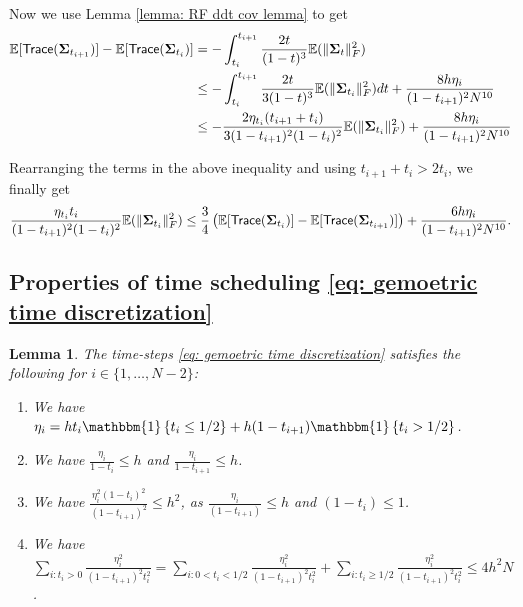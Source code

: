\documentclass{article}
\theoremstyle{plain}
\newtheorem{lemma}[theorem]{Lemma}
\theoremstyle{definition}
\theoremstyle{remark}
\def\bbE{\mathbb{E}}
\def\bSigma{{\boldsymbol\Sigma}}
\def\Norm#1{\Vert#1\Vert}
\def\tr{{\sf tr}}
\def\tr{{\sf Trace}}
\def\ind{{\mathbbm{1}}}
\newcommand{\bc}[1]{\left\{{#1}\right\}}
\begin{document}
Now we use Lemma \ref{lemma: RF ddt cov lemma} to get 
\begin{equation*}
    \begin{aligned}
        \bbE [\tr(\bSigma_{t_{i+1}})] - \bbE[\tr(\bSigma_{t_{i}})] & =  -\int_{t_{i}}^{t_{i+1}} \frac{2t}{(1-t)^3} \bbE(\Norm{\bSigma_t}_F^2)\\
        & \le - \int_{t_i}^{t_{i+1}} \frac{2t }{3(1-t)^3 }\bbE(\Norm{\bSigma_{t_i}}_F^2)dt + \frac{8 h \eta_{i}}{(1-t_{i+1})^2 N^{10}}\\
        & \le - \frac{2 \eta_{t_i}(t_{i+1}+ t_i)}{3(1-t_{i+1})^2 (1-t_i)^2}  \bbE(\Norm{\bSigma_{t_i}}_F^2) + \frac{8 h \eta_{i} }{(1-t_{i+1})^2 N^{10}}
    \end{aligned}
\end{equation*}

Rearranging the terms in the above inequality and using $t_{i+1} + t_i> 2t_i$, we finally get 
\begin{equation}
    \label{eq: Main cov bound via trace}
    \frac{ \eta_{t_i}t_i}{(1-t_{i+1})^2 (1-t_i)^2}  \bbE(\Norm{\bSigma_{t_i}}_F^2)  \le \frac{3}{4} \left(\bbE [\tr(\bSigma_{t_{i}})] - \bbE[\tr(\bSigma_{t_{i+1}})]\right) + \frac{6 h \eta_{i} }{(1-t_{i+1})^2 N^{10}}.
\end{equation}

\subsection{Properties of  time scheduling \eqref{eq: gemoetric time discretization}}


\begin{lemma}
    \label{lemma: properties of time-steps}
    The time-steps \eqref{eq: gemoetric time discretization} satisfies the following for $i \in \{1, \ldots, N-2\}$:
    \begin{enumerate}[label = (\alph*)]
    \item\label{item: part a} We have $\eta_i = h t_i \ind\bc{t_{i} \le 1/2} + h (1-t_{i+1}) \ind\bc{t_i > 1/2}$.
    
    \item\label{item: part b} We have $\frac{\eta_i}{1-t_i} \le h$ and $\frac{\eta_i}{1-t_{i+1}} \le h$.
    
     \item\label{item: part c} We have $\frac{ \eta_i^2 (1-t_i)^2 }{(1-t_{i+1})^2} \le h^2 $, as $\frac{\eta_i}{(1-t_{i+1})} \le h$ and $(1-t_i) \le 1$.
     
     \item\label{item: part d} We have $\sum_{i : t_i >0}\frac{ \eta_i^2 }{(1-t_{i+1})^2 t_i^2} = \sum_{i: 0 < t_{i} < 1/2 }\frac{ \eta_i^2 }{(1-t_{i+1})^2 t_i^2} + \sum_{i: t_{i}\ge 1/2 }\frac{ \eta_i^2 }{(1-t_{i+1})^2 t_i^2} \le  4 h^2 N$.
\end{enumerate}
\end{lemma}
\end{document}

